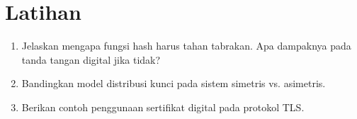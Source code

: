 \documentclass[../main.tex]{subfiles}
\begin{document}
\section{Latihan}
\begin{enumerate}
  \item Jelaskan mengapa fungsi hash harus tahan tabrakan. Apa dampaknya pada tanda tangan digital jika tidak?
  \item Bandingkan model distribusi kunci pada sistem simetris vs. asimetris.
  \item Berikan contoh penggunaan sertifikat digital pada protokol TLS.
\end{enumerate}
\end{document}
